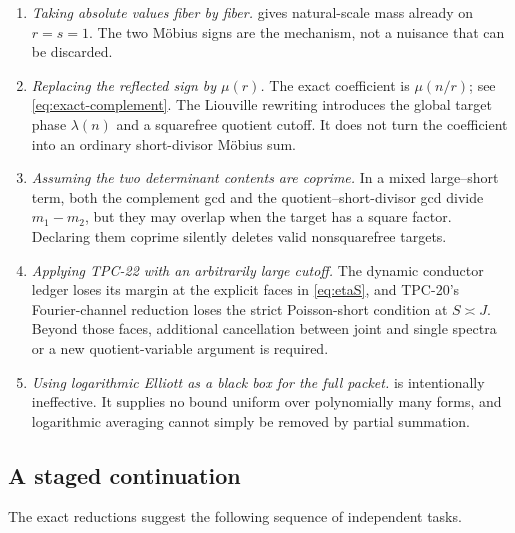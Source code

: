 \begin{enumerate}[label=\textup{(\arabic*)}]
 \item \emph{Taking absolute values fiber by fiber.}
  gives natural-scale mass already on
 \(r=s=1\).  The two M\"obius signs are the mechanism, not a nuisance
 that can be discarded.

 \item \emph{Replacing the reflected sign by \(\mu(r)\).}
 The exact coefficient is \(\mu(n/r)\); see
 \eqref{eq:exact-complement}.  The Liouville rewriting introduces the
 global target phase \(\lambda(n)\) and a squarefree quotient cutoff.
 It does not turn the coefficient into an ordinary short-divisor
 M\"obius sum.

 \item \emph{Assuming the two determinant contents are coprime.}
 In a mixed large--short term, both the complement gcd and the
 quotient--short-divisor gcd divide \(m_1-m_2\), but they may overlap
 when the target has a square factor.  Declaring them coprime silently
 deletes valid nonsquarefree targets.

 \item \emph{Applying TPC-22 with an arbitrarily large cutoff.}
 The dynamic conductor ledger loses its margin at the explicit faces
 in \eqref{eq:etaS}, and TPC-20's Fourier-channel reduction loses the
 strict Poisson-short condition at \(S\asymp J\).  Beyond those faces,
 additional cancellation between joint and single spectra or a new
 quotient-variable argument is required.

 \item \emph{Using logarithmic Elliott as a black box for the full
 packet.}
  is intentionally ineffective.  It supplies no
 bound uniform over polynomially many forms, and logarithmic averaging
 cannot simply be removed by partial summation.
\end{enumerate}

\subsection{A staged continuation}

The exact reductions suggest the following sequence of independent
tasks.

